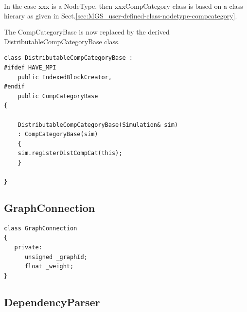 In the case xxx is a NodeType, then xxxCompCategory class is based on a class
hierary as given in Sect.\ref{sec:MGS_user-defined-class-nodetype-compcategory}.



The CompCategoryBase is now replaced by the
derived DistributableCompCategoryBase class.

\begin{verbatim}
class DistributableCompCategoryBase :                                                                         
#ifdef HAVE_MPI                                                                                               
    public IndexedBlockCreator,                                                                               
#endif                                                                                                        
    public CompCategoryBase 
{         
 
    DistributableCompCategoryBase(Simulation& sim)                                                            
    : CompCategoryBase(sim)                                                                                   
    {                                                                                                         
    sim.registerDistCompCat(this);                                                                            
    }             
       
}
\end{verbatim}




\subsection{GraphConnection}
\label{sec:GraphConnection}

\begin{lstlisting}
class GraphConnection
{
   private:
      unsigned _graphId;
      float _weight;
}
\end{lstlisting}



\subsection{DependencyParser}
\label{sec:DependencyParser}

